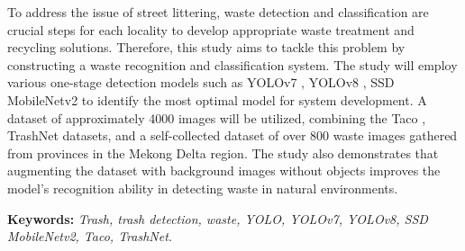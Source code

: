 \documentclass[./thesis.tex]{subfiles}
\begin{document}

{\fontsize{13}{12} \selectfont
To address the issue of street littering, waste detection and classification are crucial steps for each locality to develop appropriate waste treatment and recycling solutions.
Therefore, this study aims to tackle this problem by constructing a waste recognition and classification system. The study will employ various one-stage detection models such as YOLOv7 \cite{wang2022yolov7}, YOLOv8 \cite{YOLOv8}, SSD MobileNetv2 \cite{Liu_2016} \cite{sandler2019mobilenetv2} to identify the most optimal model for system development.
A dataset of approximately 4000 images will be utilized, combining the Taco \cite{proença2020taco}, TrashNet \cite{yang2016classification} datasets, and a self-collected dataset of over 800 waste images gathered from provinces in the Mekong Delta region.
The study also demonstrates that augmenting the dataset with background images without objects improves the model's recognition ability in detecting waste in natural environments.
}
\bigskip

{\bf Keywords:} \textit{Trash, trash detection, waste, YOLO, YOLOv7, YOLOv8, SSD MobileNetv2, Taco, TrashNet.}
\end{document}
